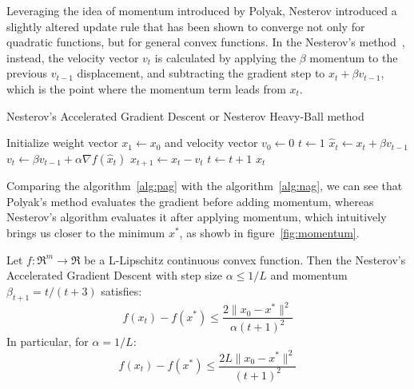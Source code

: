 Leveraging the idea of momentum introduced by Polyak, Nesterov introduced a slightly altered update rule that has been shown to converge not only for quadratic functions, but for general convex functions. In the Nesterov's method~\cite{nesterov1998introductory}, instead, the velocity vector $v_t$ is calculated by applying the $\beta$ momentum to the previous $v_{t-1}$ displacement, and subtracting the gradient step to $x_t + \beta v_{t-1}$, which is the point where the momentum term leads from $x_t$.

\begin{algorithm}[H]
	\caption{Nesterov's Accelerated Gradient Descent or Nesterov Heavy-Ball method}
	\label{alg:nag}
	\begin{algorithmic}
		\Require{Momentum $\beta \in [0,1)$}
			\State Initialize weight vector $x_1 \gets x_0$ and velocity vector $v_0 \gets 0$
			\State $t \gets 1$
				\State $\hat{x}_t \gets x_t + \beta v_{t-1}$
				\State $v_t \gets \beta v_{t-1} + \alpha \nabla f(\hat{x}_t)$
				\State $x_{t+1} \gets x_t - v_t$
				\State $t \gets t + 1$
			\EndWhile
			\State \Return $x_t$
		\EndFunction
	\end{algorithmic}
\end{algorithm}

Comparing the algorithm~\ref{alg:pag} with the algorithm~\ref{alg:nag}, we can see that Polyak’s method evaluates the gradient before adding momentum, whereas Nesterov’s algorithm evaluates it after applying momentum, which intuitively brings us closer to the minimum $x^*$, as showb in figure~\ref{fig:momentum}.

\begin{theorem} \label{thm:cvx_nag_convergence}
Let $f: \Re^m \rightarrow \Re$ be a L-Lipschitz continuous convex function. Then the Nesterov's Accelerated Gradient Descent with step size $\alpha \leq 1/L$ and momentum $\beta_{t+1} = t / (t+3)$ satisfies:
$$
f(x_t) - f(x^*) \leq \frac{2 \| x_0 - x^* \|^2}{\alpha (t+1)^2}
$$
In particular, for $\alpha = 1/L$:
$$
f(x_t) - f(x^*) \leq \frac{2L \| x_0 - x^* \|^2}{(t+1)^2}
$$
\end{theorem}

